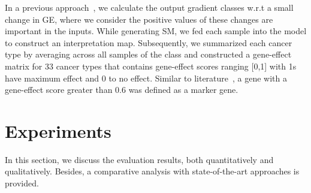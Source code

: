 \hspace*{3.5mm} In a previous approach~\cite{karim2019onconetexplainer}, we calculate the output gradient classes w.r.t a small change in GE, where we consider the positive values of these changes are important in the inputs. While generating SM, we fed each sample into the model to construct an interpretation map. Subsequently, we summarized each cancer type by averaging across all samples of the class and constructed a gene-effect matrix for 33 cancer types that contains gene-effect scores ranging [0,1] with 1s have maximum effect and 0 to no effect. Similar to literature~\cite{mostavi2019convolutional}, a gene with a gene-effect score greater than 0.6 was defined as a marker gene.

\section{Experiments}\label{chapter_5:results} 
In this section, we discuss the evaluation results, both quantitatively and qualitatively. Besides, a comparative analysis with state-of-the-art approaches is provided. 

